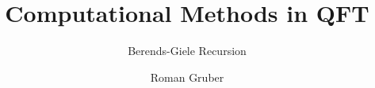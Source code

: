 \documentclass[10pt]{beamer}
\title{Computational Methods in QFT}
\subtitle{Berends-Giele Recursion}
\author{Roman Gruber}
\institute{}
\begin{document}
\nocite{*}

\maketitle

\end{document}
